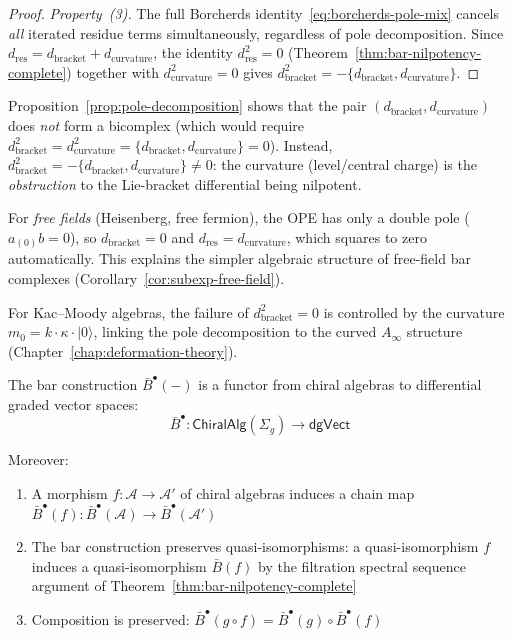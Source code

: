 \begin{proof}
\emph{Property~(3).}  The full Borcherds identity~\eqref{eq:borcherds-pole-mix} cancels \emph{all} iterated residue terms simultaneously, regardless of pole decomposition.  Since $d_{\mathrm{res}} = d_{\mathrm{bracket}} + d_{\mathrm{curvature}}$, the identity $d_{\mathrm{res}}^2 = 0$ (Theorem~\ref{thm:bar-nilpotency-complete}) together with $d_{\mathrm{curvature}}^2 = 0$ gives $d_{\mathrm{bracket}}^2 = -\{d_{\mathrm{bracket}}, d_{\mathrm{curvature}}\}$.
\end{proof}

\begin{remark}\label{rem:bicomplex-obstruction}
Proposition~\ref{prop:pole-decomposition} shows that the pair $(d_{\mathrm{bracket}}, d_{\mathrm{curvature}})$ does \emph{not} form a bicomplex (which would require $d_{\mathrm{bracket}}^2 = d_{\mathrm{curvature}}^2 = \{d_{\mathrm{bracket}}, d_{\mathrm{curvature}}\} = 0$).  Instead, $d_{\mathrm{bracket}}^2 = -\{d_{\mathrm{bracket}}, d_{\mathrm{curvature}}\} \neq 0$: the curvature (level/central charge) is the \emph{obstruction} to the Lie-bracket differential being nilpotent.

For \emph{free fields} (Heisenberg, free fermion), the OPE has only a double pole ($a_{(0)}b = 0$), so $d_{\mathrm{bracket}} = 0$ and $d_{\mathrm{res}} = d_{\mathrm{curvature}}$, which squares to zero automatically.  This explains the simpler algebraic structure of free-field bar complexes (Corollary~\ref{cor:subexp-free-field}).

For Kac--Moody algebras, the failure of $d_{\mathrm{bracket}}^2 = 0$ is controlled by the curvature $m_0 = k \cdot \kappa \cdot |0\rangle$, linking the pole decomposition to the curved $A_\infty$ structure (Chapter~\ref{chap:deformation-theory}).
\end{remark}

\begin{corollary}\label{cor:bar-functorial}
The bar construction $\bar{B}^{\bullet}(-)$ is a functor from chiral algebras to differential graded vector spaces:
\[\bar{B}^{\bullet}: \mathsf{ChiralAlg}(\Sigma_g) \to \mathsf{dgVect}\]

Moreover:
\begin{enumerate}
\item A morphism $f: \mathcal{A} \to \mathcal{A}'$ of chiral algebras induces a chain map $\bar{B}^{\bullet}(f): \bar{B}^{\bullet}(\mathcal{A}) \to \bar{B}^{\bullet}(\mathcal{A}')$
\item The bar construction preserves quasi-isomorphisms: a quasi-isomorphism $f$ induces a quasi-isomorphism $\bar{B}(f)$ by the filtration spectral sequence argument of Theorem~\ref{thm:bar-nilpotency-complete}
\item Composition is preserved: $\bar{B}^{\bullet}(g \circ f) = \bar{B}^{\bullet}(g) \circ \bar{B}^{\bullet}(f)$
\end{enumerate}
\end{corollary}

